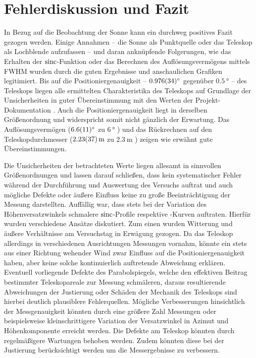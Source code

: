 \section{Fehlerdiskussion und Fazit}
In Bezug auf die Beobachtung der Sonne kann ein durchweg positives Fazit gezogen werden.
Einige Annahmen -- die Sonne als Punktquelle oder das Teleskop als Lochblende aufzufassen -- und daran anknüpfende Folgerungen, wie das Erhalten der $\operatorname{sinc}$-Funktion oder das Berechnen des Auflösungsvermögens mittels FWHM wurden durch die guten Ergebnisse und anschaulichen Grafiken legitimiert.
Bis auf die Positioniergenauigkeit -- $\SI{0.976 \pm 0.034}{\degree}$ gegenüber $\SI{0.5}{\degree}$ -- des Teleskops liegen alle ermittelten Charakteristika des Teleskops auf Grundlage der Unsicherheiten in guter Übereinstimmung mit den Werten der Projekt-Dokumentation \cite{Usermanual}.
Auch die Positioniergenauigkeit liegt in derselben Größenordnung und widerspricht somit nicht gänzlich der Erwartung.
Das Auflösungsvermögen ($\SI{6.6 \pm 1.1}{\degree}$ zu $\SI{6}{\degree}$ \cite{Usermanual}) und das Rückrechnen auf den Teleskopdurchmesser ($\SI{2.23 \pm 0.37}{\metre}$ zu $\SI{2.3}{\metre}$ \cite{Usermanual}) zeigen wie erwähnt gute Übereinstimmungen.\newline

Die Unsicherheiten der betrachteten Werte liegen allesamt in sinnvollen Größenordnungen und lassen darauf schließen, dass kein systematischer Fehler während der Durchführung und Auswertung des Versuchs auftrat und auch mögliche Defekte oder äußere Einfluss keine zu große Beeinträchtigung der Messung darstellten.
Auffällig war, dass stets bei der Variation des Höhenversatzwinkels schmalere $\operatorname{sinc}$-Profile respektive -Kurven auftraten.
Hierfür wurden verschiedene Ansätze diskutiert.
Zum einen wurden Witterung und äußere Verhältnisse am Versuchstag in Erwägung gezogen. Da das Teleskop allerdings in verschiedenen Ausrichtungen Messungen vornahm, könnte ein stets aus einer Richtung wehender Wind zwar Einfluss auf die Positioniergenauigkeit haben, aber keine solche kontinuierlich auftretende Abweichung erklären.
Eventuell vorliegende Defekte des Parabolspiegels, welche den effektiven Beitrag bestimmter Teleskopareale zur Messung schmäleren, daraus resultierende Abweichungen der Justierung oder Schäden der Mechanik des Teleskops sind hierbei deutlich plausiblere Fehlerquellen.
Mögliche Verbesserungen hinsichtlich der Messgenauigkeit könnten durch eine größere Zahl Messungen oder beispielsweise kleinschrittigere Variation der Versatzwinkel in Azimut und Höhenkomponente erreicht werden.
Die Defekte am Teleskop könnten durch regelmäßigere Wartungen behoben werden.
Zudem könnten diese bei der Justierung berücksichtigt werden um die Messergebnisse zu verbessern.

